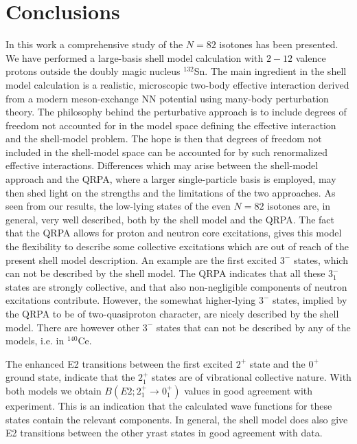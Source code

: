 \section{Conclusions}

In this work a comprehensive study of the $N=82$ isotones has been 
presented. We have performed a large-basis shell model calculation with 
$2 - 12$ valence protons outside  the doubly magic nucleus $^{132}$Sn. The 
main ingredient in the shell model calculation is a realistic, 
microscopic two-body effective interaction derived from a modern 
meson-exchange NN potential using many-body perturbation theory. 
The philosophy behind the perturbative approach is to include degrees
of freedom not accounted for in the model space defining the effective
interaction and the shell-model problem. The hope is then that
degrees of freedom not included in the shell-model
space can be accounted for by such renormalized effective
interactions. Differences which may arise between the shell-model
approach and the QRPA, where a larger single-particle basis is employed,
may then shed light on the strengths and the limitations of the two approaches.
As seen from our results, 
the low-lying states of the even $N=82$ isotones are, in general, very well
described, both by the shell model and the QRPA. The fact that the QRPA allows
for proton and neutron core excitations, gives this model the flexibility to
describe some collective excitations 
which are out of reach of the present shell 
model description. An example are the first excited $3^{-}$ states, which can 
not be described by the shell model. The QRPA indicates that all these 
$3^{-}_{1}$ states are strongly collective, and that also non-negligible 
components of neutron excitations contribute. However, the somewhat 
higher-lying $3^{-}$ states, implied by the QRPA to be of two-quasiproton
character, are nicely described by the shell model. There are however other
$3^{-}$ states that can not be described 
by any of the models, i.e. in $^{140}$Ce.

The enhanced E2 transitions between the first excited $2^{+}$ state and the 
$0^{+}$ ground state, indicate that the $2^{+}_{1}$ states are of vibrational
collective nature. With both models we obtain $B(E2;2^{+}_{1} \rightarrow 
0^{+}_{1})$ values in good agreement with experiment. This is an indication 
that the calculated wave functions for these states contain the relevant 
components. In general, the shell model does also give E2 transitions between 
the other yrast states in good agreement with data.

